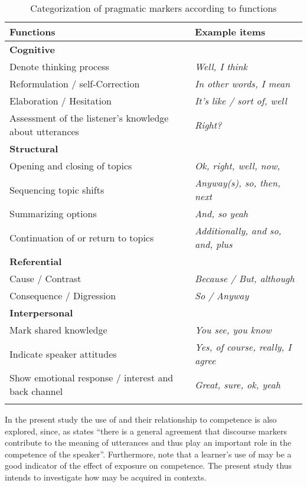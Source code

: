\documentclass[output=paper]{langsci/langscibook}
\begin{document}
\begin{table}
\caption{\label{tab:ament:1} Categorization of pragmatic markers according to functions}
 \begin{tabularx}{\textwidth}{Ql}
\lsptoprule 
\bfseries Functions & \bfseries Example items\\
\midrule
\textbf{Cognitive}\\
\midrule
{Denote thinking process} &{\textit{Well, I think}} \\ 
{Reformulation / self-Correction} & {\textit{In other words, I mean}}\\ 
{Elaboration / Hesitation}  &\textit{It’s like / sort of, well} \\ 
Assessment of the listener’s knowledge about utterances & \textit{Right?} \\
\tablevspace

\textbf{Structural}\\
\midrule 
{Opening and closing of topics}   &  {\textit{Ok, right, well, now,} } \\ 
{Sequencing topic shifts}           &   {\textit{Anyway(s), so, then, next}}  \\ 
{Summarizing options}               &  {\textit{And, so yeah}}  \\ 
Continuation of or return to topics &  \textit{Additionally, and so, and, plus}\\
\tablevspace


\textbf{Referential}\\
\midrule 
{Cause / Contrast} & {\textit{Because / But, although}}\\ 
Consequence / Digression &  \textit{So /  Anyway}\\

 \tablevspace
\textbf{Interpersonal}\\
\midrule 
{Mark shared knowledge} & {\textit{You see, you know}}\\
{Indicate speaker attitudes} &  \textit{Yes, of course, really, I agree}\\
Show emotional response / interest and back channel &  \textit{Great, sure, ok, yeah} \\
\lspbottomrule
\end{tabularx}
\end{table}



In the present study the use of  and their relationship to  competence is also explored, since, as \citep[1]{Müller2005} states “there is a general agreement that discourse markers contribute to the  meaning of utterances and thus play an important role in the  competence of the speaker”. Furthermore, \cite{SankoffEtAl1997} note that a learner’s use of  may be a good indicator of the effect of  exposure on  competence. The present study thus intends to investigate how  may be acquired in  contexts.
\end{document}
